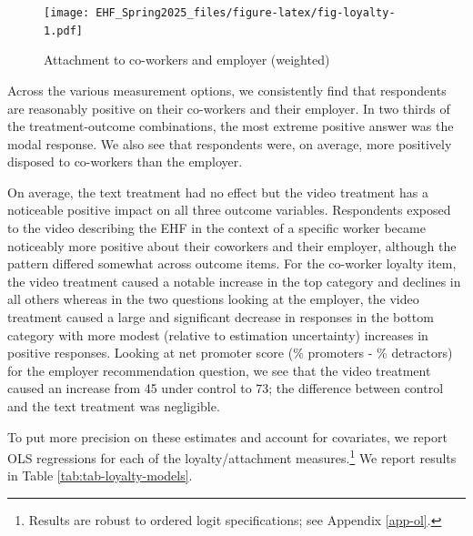 \documentclass[
  11pt,
  oneside]{article}
\begin{document}
\begin{figure}
\centering
\texttt{[image: EHF\_Spring2025\_files/figure-latex/fig-loyalty-1.pdf]}
\caption{\label{fig:fig-loyalty}Attachment to co-workers and employer (weighted)}
\end{figure}

Across the various measurement options, we consistently find that respondents are reasonably positive on their co-workers and their employer. In two thirds of the treatment-outcome combinations, the most extreme positive answer was the modal response. We also see that respondents were, on average, more positively disposed to co-workers than the employer.

On average, the text treatment had no effect but the video treatment has a noticeable positive impact on all three outcome variables. Respondents exposed to the video describing the EHF in the context of a specific worker became noticeably more positive about their coworkers and their employer, although the pattern differed somewhat across outcome items. For the co-worker loyalty item, the video treatment caused a notable increase in the top category and declines in all others whereas in the two questions looking at the employer, the video treatment caused a large and significant decrease in responses in the bottom category with more modest (relative to estimation uncertainty) increases in positive responses. Looking at net promoter score (\% promoters - \% detractors) for the employer recommendation question, we see that the video treatment caused an increase from 45 under control to 73; the difference between control and the text treatment was negligible.

To put more precision on these estimates and account for covariates, we report OLS regressions for each of the loyalty/attachment measures.\footnote{Results are robust to ordered logit specifications; see Appendix \ref{app-ol}.} We report results in Table \ref{tab:tab-loyalty-models}.
\end{document}

